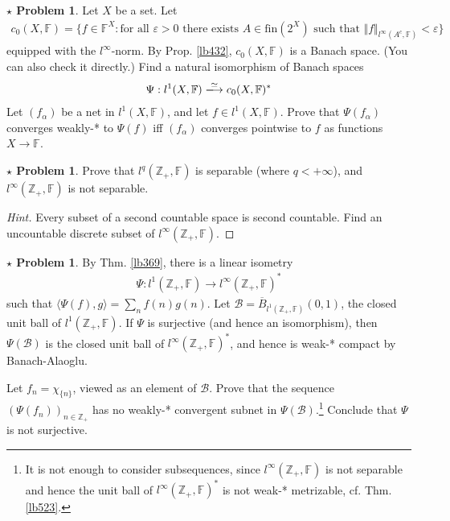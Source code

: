 \documentclass[12pt,b5paper,notitlepage]{article}
\theoremstyle{definition}
\newtheorem{sprob}[prob]{\color{red}$\star$ Problem}
\theoremstyle{plain}
\newcommand{\mc}{\mathcal}
\newcommand{\ovl}{\overline}
\newcommand{\bk}[1]{\langle {#1}\rangle}
\newcommand{\Zbb}{\mathbb Z}
\newcommand{\fin}{\mathrm{fin}}
\newcommand{\Fbb}{\mathbb F}
\newcommand{\eps}{\varepsilon}
\numberwithin{equation}{section}
\begin{document}
\begin{sprob}
Let $X$ be a set. Let
\begin{align*}
c_0(X,\Fbb)=\{f\in\Fbb^X: \text{for all $\eps>0$ there exists $A\in\fin(2^X)$ such that }\Vert f\Vert_{l^\infty(A^c,\Fbb)}<\eps\}
\end{align*}
equipped with the $l^\infty$-norm. By Prop. \ref{lb432}, $c_0(X,\Fbb)$ is a Banach space. (You can also check it directly.) Find a natural isomorphism of Banach spaces
\begin{align}
\Psi:l^1(X,\Fbb)\xlongrightarrow{\simeq} c_0(X,\Fbb)^*
\end{align}
Let $(f_\alpha)$ be a net in $l^1(X,\Fbb)$, and let $f\in l^1(X,\Fbb)$. Prove that $\Psi(f_\alpha)$ converges weakly-* to $\Psi(f)$ iff $(f_\alpha)$ converges pointwise to $f$ as functions $X\rightarrow\Fbb$.
\end{sprob}


\begin{sprob}
Prove that $l^q(\Zbb_+,\Fbb)$ is separable (where $q<+\infty$), and $l^\infty(\Zbb_+,\Fbb)$ is not separable.
\end{sprob}

\begin{proof}[Hint]
Every subset of a second countable space is second countable. Find an uncountable discrete subset of $l^\infty(\Zbb_+,\Fbb)$.
\end{proof}



\begin{sprob}\label{lb532}
By Thm. \ref{lb369}, there is a linear isometry 
\begin{gather}
\Psi:l^1(\Zbb_+,\Fbb)\rightarrow l^\infty(\Zbb_+,\Fbb)^*  \label{eq205}
\end{gather}
such that $\bk{\Psi(f),g}=\sum_n f(n)g(n)$. Let $\mc B=\ovl B_{l^1(\Zbb_+,\Fbb)}(0,1)$, the closed unit ball of $l^1(\Zbb_+,\Fbb)$. If $\Psi$ is surjective (and hence an isomorphism), then $\Psi(\mc B)$ is the closed unit ball of $l^\infty(\Zbb_+,\Fbb)^*$, and hence is weak-* compact by Banach-Alaoglu. 

Let $f_n=\chi_{\{n\}}$, viewed as an element of $\mc B$. Prove that the sequence $(\Psi(f_n))_{n\in\Zbb_+}$ has no weakly-* convergent subnet in $\Psi(\mc B)$.\footnote{It is not enough to consider subsequences, since $l^\infty(\Zbb_+,\Fbb)$ is not separable and hence the unit ball of $l^\infty(\Zbb_+,\Fbb)^*$ is not weak-* metrizable, cf. Thm. \ref{lb523}.} Conclude that $\Psi$ is not surjective.  \hfill\qedsymbol
\end{sprob}
\end{document}
